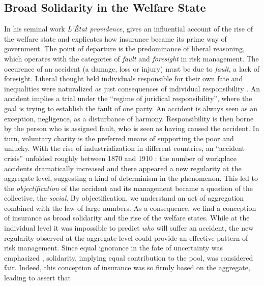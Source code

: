 \documentclass[11pt]{article} %
\makeatletter
\newcommand*{\cf}{cf.\@\xspace}
\makeatother
\begin{document}
\subsection{Broad Solidarity in the Welfare State}
In his seminal work \textit{L'Ètat providence}, \citet{ewald_letat_1986} gives an influential account of the rise of the welfare state and explicates how insurance became its prime way of government. The point of departure is the predominance of liberal reasoning, which operates with the categories of \textit{fault} and \textit{foresight} in risk management. The occurence of an accident (a damage, loss or injury) must be due to \textit{fault}, a lack of foresight. Liberal thought held individuals responsible for their own fate \citep{ewald_letat_1986} and inequalities were naturalized as just consequences of individual responsibility \citep{landes2013normative}. An accident implies a trial under the “regime of juridical responsibility”, where the goal is trying to establish the fault of one party. An accident is always
seen as an exception, negligence, as a disturbance of harmony. Responsibility is then borne by the person who is assigned fault, who is seen as having caused the accident. In turn, voluntary charity is the preferred means of supporting the poor and unlucky. 
With the rise of industrialization in different countries, an ``accident crisis'' unfolded roughly between 1870 and 1910 \citep{krippner2023unmasked}: the number of workplace accidents dramatically increased and there appeared a new regularity at the aggregate level, suggesting a kind of determinism in the phenomenon. This led to the \textit{objectification} of the accident and its management became a question of the collective, the \textit{social}. By objectification, we understand an act of aggregation combined with the law of large numbers. As a consequence, we find a conception of insurance as broad solidarity and the rise of the welfare states. While at the individual level it was impossible to predict \textit{who} will suffer an accident, the new regularity observed at the aggregate level could provide an effective pattern of risk management. Since equal ignorance in the fate of uncertainty was emphasized \citep{ewald_letat_1986}, 
solidarity, implying equal contribution to the pool, was considered fair. Indeed, this conception of insurance was so firmly based on the aggregate, leading \citet{ewald1991insurance} to assert that 
\end{document}
